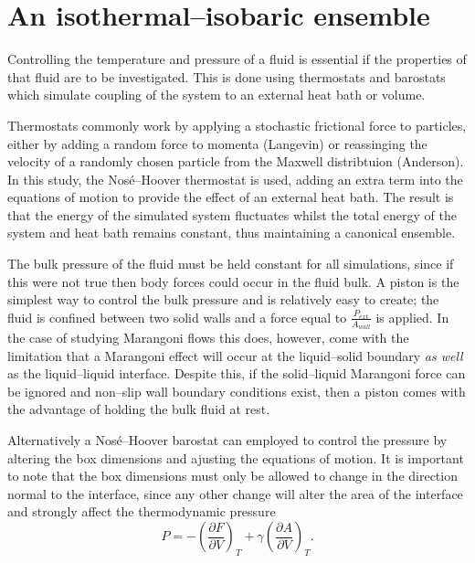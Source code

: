 \section{An isothermal--isobaric ensemble}
Controlling the temperature and pressure of a fluid is essential if the properties of that fluid are to be investigated.
This is done using thermostats and barostats which simulate coupling of the system to an external heat bath or volume.

Thermostats commonly work by applying a stochastic frictional force to particles, either by adding a random force to momenta (Langevin)\cite{Langevin} or reassinging the velocity of a randomly chosen particle from the Maxwell distribtuion (Anderson)\cite{AndersonTherm}.
In this study, the Nos\'{e}--Hoover thermostat is used,  adding an extra term into the equations of motion to provide the effect of an external heat bath.\cite{NoseHoover1, NoseHoover2, NoseHoover3}
The result is that the energy of the simulated system fluctuates whilst the total energy of the system and heat bath remains constant, thus maintaining a canonical ensemble.

The bulk pressure of the fluid must be held constant for all simulations, since if this were not true then body forces could occur in the fluid bulk.
A piston is the simplest way to control the bulk pressure and is relatively easy to create; the fluid is confined between two solid walls and a force equal to $\frac{P_{ext}}{A_{wall}}$ is applied.
In the case of studying Marangoni flows this does, however, come with the limitation that a Marangoni effect will occur at the liquid--solid boundary \textit{as well} as the liquid--liquid interface.
Despite this, if the solid--liquid Marangoni force can be ignored and non--slip wall boundary conditions exist, then a piston comes with the advantage of holding the bulk fluid at rest.

Alternatively a Nos\'{e}--Hoover barostat can employed to control the pressure by altering the box dimensions and ajusting the equations of motion. \cite{NoseHoover1, NoseHoover2, NoseHoover3}
It is important to note that the box dimensions must only be allowed to change in the direction normal to the interface, since any other change will alter the area of the interface and strongly affect the thermodynamic pressure
\begin{equation}
P = - \left( \frac{\partial F}{\partial V} \right)_{T} + \gamma \left( \frac{\partial A}{\partial V} \right)_{T}.
\end{equation}

